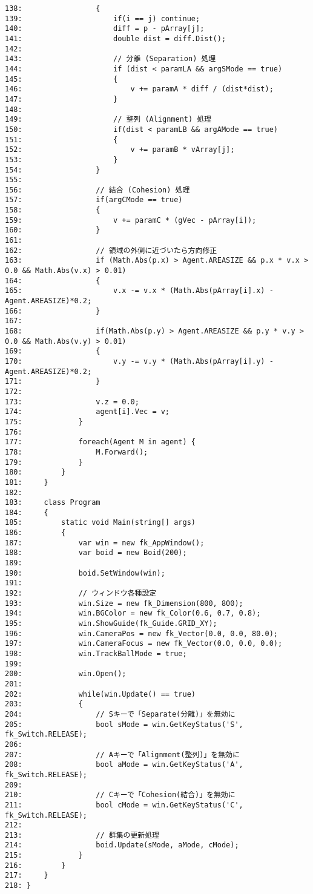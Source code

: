 \begin{breakbox}
\begin{small}
\begin{verbatim}
138:                 {
139:                     if(i == j) continue;
140:                     diff = p - pArray[j];
141:                     double dist = diff.Dist();
142: 
143:                     // 分離 (Separation) 処理
144:                     if (dist < paramLA && argSMode == true)
145:                     {
146:                         v += paramA * diff / (dist*dist);
147:                     }
148: 
149:                     // 整列 (Alignment) 処理
150:                     if(dist < paramLB && argAMode == true)
151:                     {
152:                         v += paramB * vArray[j];
153:                     }
154:                 }
155: 
156:                 // 結合 (Cohesion) 処理
157:                 if(argCMode == true)
158:                 {
159:                     v += paramC * (gVec - pArray[i]);
160:                 }
161: 
162:                 // 領域の外側に近づいたら方向修正
163:                 if (Math.Abs(p.x) > Agent.AREASIZE && p.x * v.x > 0.0 && Math.Abs(v.x) > 0.01)
164:                 {
165:                     v.x -= v.x * (Math.Abs(pArray[i].x) - Agent.AREASIZE)*0.2;
166:                 }
167: 
168:                 if(Math.Abs(p.y) > Agent.AREASIZE && p.y * v.y > 0.0 && Math.Abs(v.y) > 0.01)
169:                 {
170:                     v.y -= v.y * (Math.Abs(pArray[i].y) - Agent.AREASIZE)*0.2;
171:                 }
172: 
173:                 v.z = 0.0;
174:                 agent[i].Vec = v;
175:             }
176: 
177:             foreach(Agent M in agent) {
178:                 M.Forward();
179:             }
180:         }
181:     }
182: 
183:     class Program
184:     {
185:         static void Main(string[] args)
186:         {
187:             var win = new fk_AppWindow();
188:             var boid = new Boid(200);
189: 
190:             boid.SetWindow(win);
191: 
192:             // ウィンドウ各種設定
193:             win.Size = new fk_Dimension(800, 800);
194:             win.BGColor = new fk_Color(0.6, 0.7, 0.8);
195:             win.ShowGuide(fk_Guide.GRID_XY);
196:             win.CameraPos = new fk_Vector(0.0, 0.0, 80.0);
197:             win.CameraFocus = new fk_Vector(0.0, 0.0, 0.0);
198:             win.TrackBallMode = true;
199: 
200:             win.Open();
201: 
202:             while(win.Update() == true)
203:             {
204:                 // Sキーで「Separate(分離)」を無効に
205:                 bool sMode = win.GetKeyStatus('S', fk_Switch.RELEASE);
206: 
207:                 // Aキーで「Alignment(整列)」を無効に
208:                 bool aMode = win.GetKeyStatus('A', fk_Switch.RELEASE);
209: 
210:                 // Cキーで「Cohesion(結合)」を無効に
211:                 bool cMode = win.GetKeyStatus('C', fk_Switch.RELEASE);
212: 
213:                 // 群集の更新処理
214:                 boid.Update(sMode, aMode, cMode);
215:             }
216:         }
217:     }
218: }
\end{verbatim}
\end{small}
\end{breakbox}
